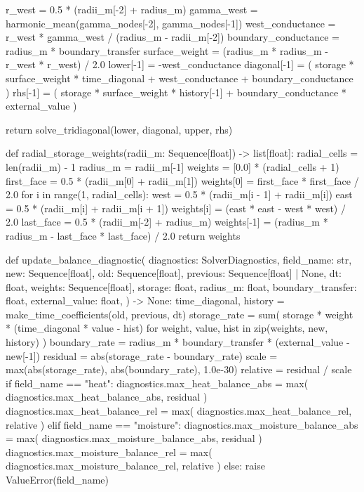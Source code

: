 \documentclass[withoutpreface,bwprint]{cumcmthesis}
\begin{document}
\begin{PythonCode}
    r_west = 0.5 * (radii_m[-2] + radius_m)
    gamma_west = harmonic_mean(gamma_nodes[-2], gamma_nodes[-1])
    west_conductance = r_west * gamma_west / (radius_m - radii_m[-2])
    boundary_conductance = radius_m * boundary_transfer
    surface_weight = (radius_m * radius_m - r_west * r_west) / 2.0
    lower[-1] = -west_conductance
    diagonal[-1] = (
        storage * surface_weight * time_diagonal
        + west_conductance
        + boundary_conductance
    )
    rhs[-1] = (
        storage * surface_weight * history[-1]
        + boundary_conductance * external_value
    )

    return solve_tridiagonal(lower, diagonal, upper, rhs)


def radial_storage_weights(radii_m: Sequence[float]) -> list[float]:
    radial_cells = len(radii_m) - 1
    radius_m = radii_m[-1]
    weights = [0.0] * (radial_cells + 1)
    first_face = 0.5 * (radii_m[0] + radii_m[1])
    weights[0] = first_face * first_face / 2.0
    for i in range(1, radial_cells):
        west = 0.5 * (radii_m[i - 1] + radii_m[i])
        east = 0.5 * (radii_m[i] + radii_m[i + 1])
        weights[i] = (east * east - west * west) / 2.0
    last_face = 0.5 * (radii_m[-2] + radius_m)
    weights[-1] = (radius_m * radius_m - last_face * last_face) / 2.0
    return weights


def update_balance_diagnostic(
    diagnostics: SolverDiagnostics,
    field_name: str,
    new: Sequence[float],
    old: Sequence[float],
    previous: Sequence[float] | None,
    dt: float,
    weights: Sequence[float],
    storage: float,
    radius_m: float,
    boundary_transfer: float,
    external_value: float,
) -> None:
    time_diagonal, history = make_time_coefficients(old, previous, dt)
    storage_rate = sum(
        storage * weight * (time_diagonal * value - hist)
        for weight, value, hist in zip(weights, new, history)
    )
    boundary_rate = radius_m * boundary_transfer * (external_value - new[-1])
    residual = abs(storage_rate - boundary_rate)
    scale = max(abs(storage_rate), abs(boundary_rate), 1.0e-30)
    relative = residual / scale
    if field_name == "heat":
        diagnostics.max_heat_balance_abs = max(
            diagnostics.max_heat_balance_abs, residual
        )
        diagnostics.max_heat_balance_rel = max(
            diagnostics.max_heat_balance_rel, relative
        )
    elif field_name == "moisture":
        diagnostics.max_moisture_balance_abs = max(
            diagnostics.max_moisture_balance_abs, residual
        )
        diagnostics.max_moisture_balance_rel = max(
            diagnostics.max_moisture_balance_rel, relative
        )
    else:
        raise ValueError(field_name)



\end{PythonCode}
\end{document}
